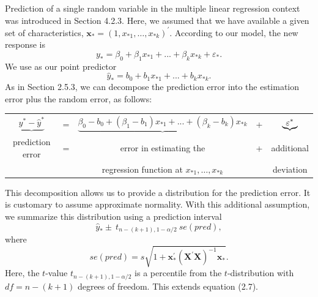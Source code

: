 Prediction of a single random variable in the multiple linear
regression context was introduced in Section 4.2.3. Here, we assumed
that we have available a given set of characteristics,
$\mathbf{x}_{\ast}=(1,x_{\ast 1},\ldots,x_{\ast k})^{\prime }$.
According to our model, the new response is
\begin{equation*}
y_{\ast}=\beta_0 +\beta_1 x_{\ast 1}+...+\beta _{k}x_{\ast k}+
\varepsilon_{\ast}.
\end{equation*}
We use as our point predictor
\begin{equation*}
\hat{y}_{\ast}=b_{0}+b_{1}x_{\ast 1}+...+b_{k}x_{\ast k}.
\end{equation*}
As in Section 2.5.3, we can decompose the prediction error into the
estimation error plus the random error, as follows:
\begin{center}
\begin{tabular}{ccccc}
$\underbrace{y^{\ast}-\widehat{y}^{\ast}}$ & = &
$\underbrace{\beta_0 -b_{0}+(\beta_1 -b_{1})x_{\ast
1}+...+(\beta _{k}-b_{k})x_{\ast k}}$ & + & $\underbrace{%
\varepsilon ^{\ast}}$ \\

{\small prediction error} & {\small =} & {\small error in estimating
the } &
{\small +} & {\small additional } \\

&  & {\small regression function at $x_{\ast 1}, \ldots, x_{\ast
k}$} & & {\small deviation}

\end{tabular}
\end{center}

\noindent This decomposition allows us to provide a distribution for
the prediction error. It is customary to assume approximate
normality. With this additional assumption, we summarize this
distribution using a prediction interval
\begin{equation}
\hat{y}_{\ast}\pm \ t_{n-(k+1),1-\alpha /2} ~ se(pred),
\end{equation}
where
\begin{equation*}
se(pred) = s \sqrt{1+\mathbf{x}_{\ast}^{\prime }(\mathbf{X}^{\prime
} \mathbf{X})^{-1}\mathbf{x}_{\ast}} .
\end{equation*}
Here, the $t$-value $t_{n-(k+1),1-\alpha /2}$ is a percentile from
the $t$-distribution with $df=n-(k+1)$ degrees of freedom. This
extends equation (2.7).

